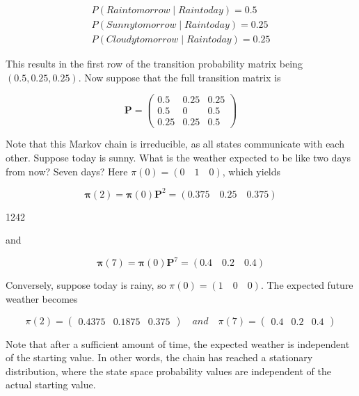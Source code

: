 \documentclass{article}
\begin{document}
\begin{equation}
\begin{array}{l}P(Rain tomorrow\mid Rain today)=0.5\\ P(Sunny tomorrow\mid Rain today)=0.25\\ P(Cloudy tomorrow\mid Rain today)=0.25\end{array}
\end{equation}

This results in the first row of the transition probability matrix being  $ (0.5, 0.25, 0.25) $. Now suppose that the full transition matrix is

\begin{equation}
\mathbf{P}=\begin{pmatrix}0.5&0.25&0.25\\0.5&0&0.5\\0.25&0.25&0.5\end{pmatrix}
\end{equation}

Note that this Markov chain is irreducible, as all states communicate with each other. Suppose today is sunny. What is the weather expected to be like two days from now? Seven days? Here  $ \pi(0) = (0 \quad 1 \quad 0) $, which yields

\begin{equation}
\boldsymbol{\pi}(2)=\boldsymbol{\pi}(0)\mathbf{P}^{2}=(0.375\quad0.25\quad0.375)
\end{equation}

1242

and

\begin{equation}
\boldsymbol{\pi}(7)=\boldsymbol{\pi}(0)\mathbf{P}^{7}=(0.4\quad0.2\quad0.4)
\end{equation}

Conversely, suppose today is rainy, so  $ \pi(0) = (1 \quad 0 \quad 0) $. The expected future weather becomes

\begin{equation}
\pi(2)=\begin{pmatrix}0.4375&0.1875&0.375\end{pmatrix}\quad and\quad\pi(7)=\begin{pmatrix}0.4&0.2&0.4\end{pmatrix}
\end{equation}

Note that after a sufficient amount of time, the expected weather is independent of the starting value. In other words, the chain has reached a stationary distribution, where the state space probability values are independent of the actual starting value.
\end{document}
